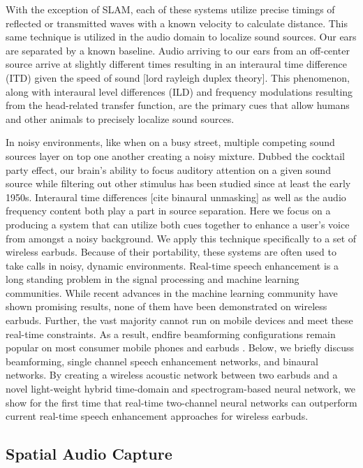 \documentclass [11pt, proquest] {uwthesis}[2020/02/24]
\begin{document}
With the exception of SLAM, each of these systems utilize precise timings of reflected or transmitted waves with a known velocity to calculate distance. This same technique is utilized in the audio domain to localize sound sources. Our ears are separated by a known baseline. Audio arriving to our ears from an off-center source arrive at slightly different times resulting in an interaural time difference (ITD) given the speed of sound [lord rayleigh duplex theory]. This phenomenon, along with interaural level differences (ILD) and frequency modulations resulting from the head-related transfer function, are the primary cues that allow humans and other animals to precisely localize sound sources.

In noisy environments, like when on a busy street, multiple competing sound sources layer on top one another creating a noisy mixture. Dubbed the cocktail party effect, our brain's ability to focus auditory attention on a given sound source while filtering out other stimulus has been studied since at least the early 1950s. Interaural time differences [cite binaural unmasking] as well as the audio frequency content both play a part in source separation. Here we focus on a producing a system that can utilize both cues together to enhance a user's voice from amongst a noisy background. We apply this technique specifically to a set of wireless earbuds. Because of their portability, these systems are often used to take calls in noisy, dynamic environments. Real-time speech enhancement is a long standing problem in the signal processing and machine learning communities.  While recent advances in the machine learning community have shown promising results, none of them have been demonstrated on wireless earbuds. Further, the vast majority cannot run on mobile devices and meet these real-time constraints. As a result, endfire beamforming configurations remain popular on most consumer mobile phones and earbuds \cite{samsungglobalnewsroom_2014, airpods, sennheiser_2020, beamforming-app-note}. Below, we briefly discuss beamforming, single channel speech enhancement networks, and binaural networks. By creating a wireless acoustic  network between two earbuds and a novel light-weight hybrid  time-domain and spectrogram-based  neural network, we show for the first time that real-time two-channel neural networks can outperform  current real-time speech enhancement approaches for wireless earbuds.

\subsection{Spatial Audio Capture}
\end{document}
